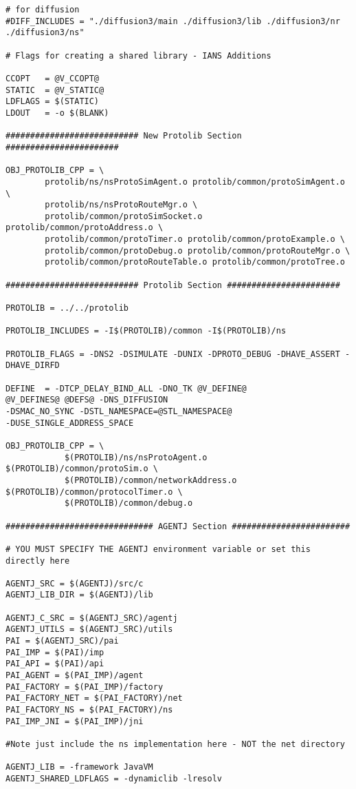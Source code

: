 \begin{verbatim}
# for diffusion
#DIFF_INCLUDES = "./diffusion3/main ./diffusion3/lib ./diffusion3/nr ./diffusion3/ns"

# Flags for creating a shared library - IANS Additions
 
CCOPT	= @V_CCOPT@
STATIC	= @V_STATIC@
LDFLAGS	= $(STATIC)
LDOUT	= -o $(BLANK)

########################### New Protolib Section #######################

OBJ_PROTOLIB_CPP = \
        protolib/ns/nsProtoSimAgent.o protolib/common/protoSimAgent.o \
        protolib/ns/nsProtoRouteMgr.o \
        protolib/common/protoSimSocket.o protolib/common/protoAddress.o \
        protolib/common/protoTimer.o protolib/common/protoExample.o \
        protolib/common/protoDebug.o protolib/common/protoRouteMgr.o \
        protolib/common/protoRouteTable.o protolib/common/protoTree.o

########################### Protolib Section #######################

PROTOLIB = ../../protolib

PROTOLIB_INCLUDES = -I$(PROTOLIB)/common -I$(PROTOLIB)/ns

PROTOLIB_FLAGS = -DNS2 -DSIMULATE -DUNIX -DPROTO_DEBUG -DHAVE_ASSERT -DHAVE_DIRFD

DEFINE	= -DTCP_DELAY_BIND_ALL -DNO_TK @V_DEFINE@ 
@V_DEFINES@ @DEFS@ -DNS_DIFFUSION 
-DSMAC_NO_SYNC -DSTL_NAMESPACE=@STL_NAMESPACE@ 
-DUSE_SINGLE_ADDRESS_SPACE

OBJ_PROTOLIB_CPP = \
            $(PROTOLIB)/ns/nsProtoAgent.o $(PROTOLIB)/common/protoSim.o \
            $(PROTOLIB)/common/networkAddress.o $(PROTOLIB)/common/protocolTimer.o \
            $(PROTOLIB)/common/debug.o

############################## AGENTJ Section ########################
 
# YOU MUST SPECIFY THE AGENTJ environment variable or set this directly here

AGENTJ_SRC = $(AGENTJ)/src/c
AGENTJ_LIB_DIR = $(AGENTJ)/lib

AGENTJ_C_SRC = $(AGENTJ_SRC)/agentj
AGENTJ_UTILS = $(AGENTJ_SRC)/utils
PAI = $(AGENTJ_SRC)/pai
PAI_IMP = $(PAI)/imp
PAI_API = $(PAI)/api
PAI_AGENT = $(PAI_IMP)/agent
PAI_FACTORY = $(PAI_IMP)/factory
PAI_FACTORY_NET = $(PAI_FACTORY)/net
PAI_FACTORY_NS = $(PAI_FACTORY)/ns
PAI_IMP_JNI = $(PAI_IMP)/jni

#Note just include the ns implementation here - NOT the net directory

AGENTJ_LIB = -framework JavaVM 
AGENTJ_SHARED_LDFLAGS = -dynamiclib -lresolv


\end{verbatim}
